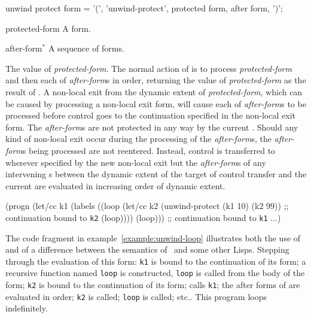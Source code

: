 \begin{optDefinition}
%
\Syntax
\savesyntax\unwindprotectSyntax\vbox{\syntax
unwind protect form
   = '(', 'unwind-protect', protected form,
     {after form}, ')';
\endsyntax}
%
\begin{arguments}
    \item[protected-form] A form.
    \item[after-form$^*$] A sequence of forms.
\end{arguments}
%
\result%
The value of {\em protected-form}.
%
\remarks%
The normal action of  is to process {\em
    protected-form} and then each of {\em after-form}s in order, returning the
value of {\em protected-form} as the result of .  A
non-local exit from the dynamic extent of {\em protected-form}, which can be
caused by processing a non-local exit form, will cause each of {\em after-form}s
to be processed before control goes to the continuation specified in the
non-local exit form.  The {\em after-form}s are not protected in any way by the
current .  Should any kind of non-local exit occur
during the processing of the {\em after-form}s, the {\em after-form}s being
processed are not reentered.  Instead, control is transferred to wherever
specified by the new non-local exit but the {\em after-form}s of any intervening
s between the dynamic extent of the target of control
transfer and the current  are evaluated in increasing
order of dynamic extent.
%
\examples
%
\begin{example}
\label{example:unwind-loop}
{\syntax
(progn
  (let/cc k1
    (labels
      ((loop
         (let/cc k2 (unwind-protect (k1 10) (k2 99))
         ;; continuation bound to {\tt k2}
         (loop))))
      (loop)))
  ;; continuation bound to {\tt k1}
  ...)
\endsyntax}
\end{example}
%
The code fragment in example~\ref{example:unwind-loop} illustrates both the use
of  and of a difference between the semantics of
\eulisp\ and some other Lisps.  Stepping through the evaluation of this form:
{\tt k1} is bound to the continuation of its  form; a
recursive function named {\tt loop} is constructed, {\tt loop} is called from
the body of the  form; {\tt k2} is bound to the continuation
of its  form;  calls {\tt k1}; the
after forms of  are evaluated in order; {\tt k2} is
called; {\tt loop} is called; etc..  This program loops indefinitely.
%
\end{optDefinition}

